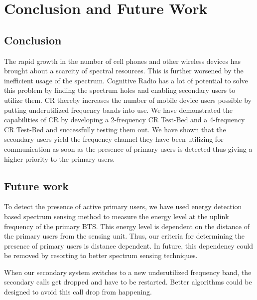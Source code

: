 \chapter{Conclusion and Future Work}

\section{Conclusion}
The rapid growth in the number of cell phones and other wireless devices has 
brought about a scarcity of spectral resources. This is further worsened by the
inefficient usage of the spectrum. Cognitive Radio has a lot of potential to solve this problem
by finding the spectrum holes and enabling secondary users to utilize them. CR 
thereby increases the number of mobile device users possible by putting 
underutilized frequency bands into use. We have 
demonstrated the capabilities of CR by developing a 2-frequency CR Test-Bed and
a 4-frequency CR Test-Bed and successfully testing them out.  We have shown
that the secondary users yield the frequency channel they have been utilizing
for communication as soon as the presence of primary users is detected thus
giving a higher priority to the primary users.


\section{Future work}
To detect the presence of active primary users, we have used energy detection 
based spectrum sensing method to measure the energy level at the uplink 
frequency of the primary BTS. This energy level is dependent
on the distance of the primary users from the sensing unit. Thus, our criteria
for determining the presence of primary users is distance dependent. 
In future, this dependency could be removed by resorting to better 
spectrum sensing techniques.

When our secondary system switches to a new underutilized frequency band, the
secondary calls get dropped and have to be restarted. Better
algorithms could be designed to avoid this call drop from happening.